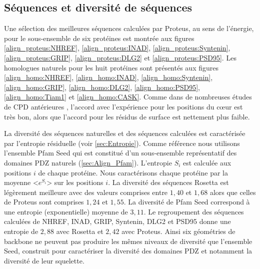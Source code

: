 \subsection{Séquences et diversité de séquences}
Une sélection des meilleures séquences calculées par Proteus, au sens de l'énergie, pour le sous-ensemble de six protéines est montrée aux figures \ref{align_proteus:NHREF}, \ref{align_proteus:INAD}, \ref{align_proteus:Syntenin}, \ref{align_proteus:GRIP}, \ref{align_proteus:DLG2} et \ref{align_proteus:PSD95}. Les homologues naturels pour les huit protéines sont présentés aux figures \ref{align_homo:NHREF}, \ref{align_homo:INAD}, \ref{align_homo:Syntenin}, \ref{align_homo:GRIP}, \ref{align_homo:DLG2}, \ref{align_homo:PSD95}, \ref{align_homo:Tiam1} et \ref{align_homo:CASK}. Comme dans de nombreuses études de CPD antérieures \cite{Jaramillo02,Dantas03}, l'accord avec l'expérience pour les positions du cœur est très bon, alors que l'accord pour les résidus de surface est nettement plus faible.

La diversité des séquences naturelles et des séquences calculées est caractérisée par l'entropie résiduelle (voir \ref{sec:Entropie}). Comme référence nous utilisons l'ensemble Pfam Seed qui est constitué d'un sous-ensemble représentatif des domaines PDZ naturels (\ref{sec:Align_Pfam}). L'entropie $S_i$ est calculée aux positions $i$ de chaque protéine. Nous caractérisons chaque protéine par la moyenne <$e^{S_i}$> sur les positions $i$. La diversité des séquences Rosetta est légèrement meilleure avec des valeurs comprises entre $1,40$ et $1,68$ alors que celles de Proteus sont comprises $1,24$ et $1,55$. La diversité de Pfam Seed correspond à une entropie (exponentielle) moyenne de $3,11$. Le regroupement des séquences calculées de NHREF, INAD, GRIP, Syntenin, DLG2 et PSD95 donne une entropie de $2,88$ avec Rosetta et $2,42$ avec Proteus. Ainsi six géométries de backbone ne peuvent pas produire les mêmes niveaux de diversité que l'ensemble Seed, construit pour caractériser la diversité des domaines PDZ et notamment la diversité de leur squelette.


